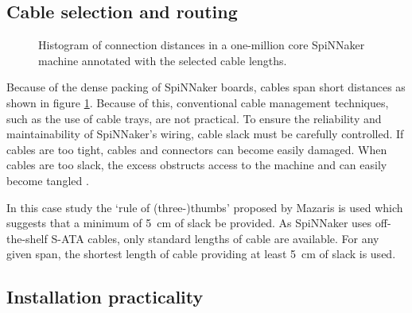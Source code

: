 		\subsection{Cable selection and routing}
			
			\begin{figure}
				
				\center
				
				\caption{Histogram of connection distances in a one-million core
				SpiNNaker machine annotated with the selected cable lengths.}
				\label{fig:wire-length-histogram}
				
			\end{figure}
			
			Because of the dense packing of SpiNNaker boards, cables span short
			distances as shown in figure \ref{fig:wire-length-histogram}.  Because of
			this, conventional cable management techniques, such as the use of cable
			trays, are not practical. To ensure the reliability and maintainability
			of SpiNNaker's wiring, cable slack must be carefully controlled.  If
			cables are too tight, cables and connectors can become easily damaged.
			When cables are too slack, the excess obstructs access to the machine and
			can easily become tangled \cite{cisco07}.
			
			In this case study the `rule of (three-)thumbs' proposed by Mazaris
			\cite{mazaris97} is used which suggests that a minimum of
			\SI{5}{\centi\meter} of slack be provided. As SpiNNaker uses
			off-the-shelf S-ATA cables, only standard lengths of cable are available.
			For any given span, the shortest length of cable providing at least
			\SI{5}{\centi\meter} of slack is used.
		
		\subsection{Installation practicality}
			
